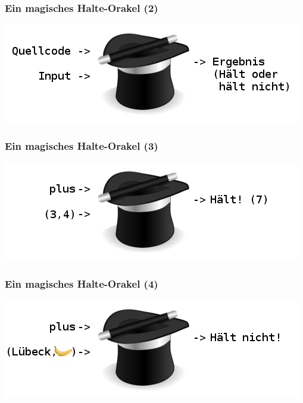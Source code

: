 \documentclass[aspectratio=43]{beamer}
\begin{document}

\begin{frame}
\frametitle{Ein magisches Halte-Orakel (2)}
\begin{center}
\includegraphics[scale=1.4]{images/erklaerung01.png} 
\end{center}
\end{frame}


\begin{frame}
\frametitle{Ein magisches Halte-Orakel (3)}
\begin{center}
\includegraphics[scale=1.4]{images/erklaerung02.png} 
\end{center}
\end{frame}


\begin{frame}
\frametitle{Ein magisches Halte-Orakel (4)}
\begin{center}
\includegraphics[scale=1.4]{images/erklaerung03.png} 
\end{center}
\end{frame}
\end{document}
